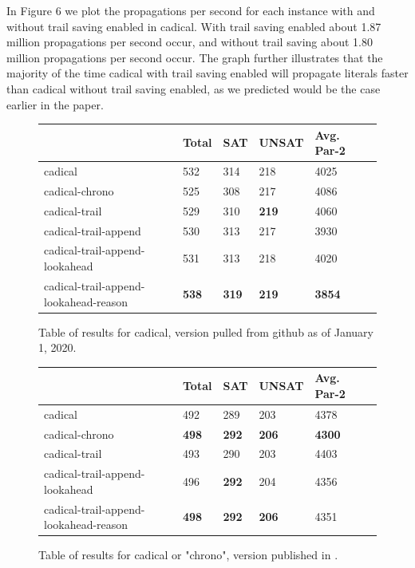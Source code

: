 \documentclass[runningheads]{llncs}
\begin{document}
In Figure 6 we plot the propagations per second for each instance with and without trail saving enabled in cadical. With trail saving enabled about 1.87 million propagations per second occur, and without trail saving about 1.80 million propagations per second occur. The graph further illustrates that the majority of the time cadical with trail saving enabled will propagate literals faster than cadical without trail saving enabled, as we predicted would be the case earlier in the paper.

\begin{figure}
\centering
    \begin{tabular}{|l|l|l|l|l|l|}
      \hline
      & Total & SAT & UNSAT & Avg. Par-2 \\ \hline
      cadical                  & 532          & 314 &  218  & 4025                             \\ \hline
      cadical-chrono          & 525          & 308 &  217  & 4086                             \\ \hline
      cadical-trail           & 529          & 310 &  \textbf{219}  & 4060                   \\ \hline
      cadical-trail-append & 530 & 313 & 217 & 3930 \\ \hline
      cadical-trail-append-lookahead & 531          & 313 &  218  & 4020                      \\ \hline
      cadical-trail-append-lookahead-reason & \textbf{538} & \textbf{319} & \textbf{219} & \textbf{3854} \\ \hline
    \end{tabular}
    \caption{Table of results for cadical, version pulled from github as of January 1, 2020.}
\end{figure}

\begin{figure}
\centering
    \begin{tabular}{|l|l|l|l|l|l|}
      \hline
      & Total & SAT & UNSAT & Avg. Par-2 \\ \hline
      cadical                  & 492          & 289 &  203  & 4378                            \\ \hline
      cadical-chrono   & \textbf{498}  & \textbf{292} &  \textbf{206}  & \textbf{4300}      \\ \hline
      cadical-trail           & 493          & 290 &  203  & 4403                            \\ \hline
      cadical-trail-append-lookahead & 496  & \textbf{292} &  204  & 4356                    \\ \hline
      cadical-trail-append-lookahead-reason & \textbf{498} & \textbf{292} & \textbf{206} & 4351 \\ \hline
    \end{tabular}
    \caption{Table of results for cadical or "chrono", version published in \cite{DBLP:conf/sat/MohleB19}.}
\end{figure}
\end{document}
